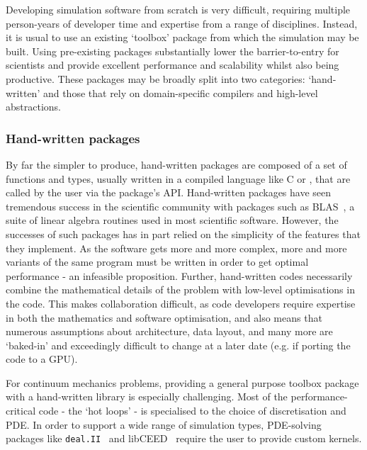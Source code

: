 \documentclass[thesis]{subfiles}
\begin{document}

Developing simulation software from scratch is very difficult, requiring multiple person-years of developer time and expertise from a range of disciplines.
Instead, it is usual to use an existing `toolbox' package from which the simulation may be built.
Using pre-existing packages substantially lower the barrier-to-entry for scientists and provide excellent performance and scalability whilst also being productive.
These packages may be broadly split into two categories: `hand-written' and those that rely on domain-specific compilers and high-level abstractions.

\subsubsection{Hand-written packages}

By far the simpler to produce, hand-written packages are composed of a set of functions and types, usually written in a compiled language like C or \cplusplus, that are called by the user via the package's API.
Hand-written packages have seen tremendous success in the scientific community with packages such as BLAS~\cite{lawsonBasicLinearAlgebra1979}, a suite of linear algebra routines used in most scientific software.
However, the successes of such packages has in part relied on the simplicity of the features that they implement.
As the software gets more and more complex, more and more variants of the same program must be written in order to get optimal performance - an infeasible proposition.
Further, hand-written codes necessarily combine the mathematical details of the problem with low-level optimisations in the code.
This makes collaboration difficult, as code developers require expertise in both the mathematics and software optimisation, and also means that numerous assumptions about architecture, data layout, and many more are `baked-in' and exceedingly difficult to change at a later date (e.g. if porting the code to a GPU).

For continuum mechanics problems, providing a general purpose toolbox package with a hand-written library is especially challenging.
Most of the performance-critical code - the `hot loops' - is specialised to the choice of discretisation and PDE.
In order to support a wide range of simulation types, PDE-solving packages like \texttt{deal.II}~\cite{dealII95,dealii2019design} and libCEED~\cite{brownLibCEEDFastAlgebra2021} require the user to provide custom kernels.
\end{document}
